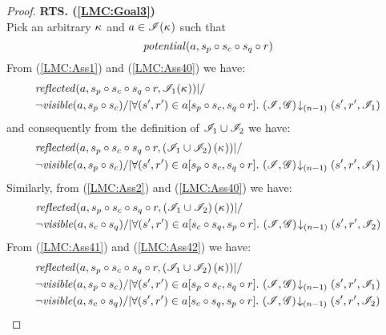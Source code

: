 \begin{lemma}
\begin{proof}
\noindent\textbf{RTS. (\ref{LMC:Goal3})}\\
Pick an arbitrary $\kappa_{}$ and $a \in\mathscr{I}(\kappa_{})$ such that
\begin{equation}
	\mathit{potential}(a, s_p \circ s_c \circ s_q \circ r) \label{LMC:Ass40}
\end{equation}
From (\ref{LMC:Ass1}) and (\ref{LMC:Ass40}) we have: 
%
\begin{align*}
	&\m{reflected}(a,s_p \composeL s_c \composeL s_q \composeL r,\lmod_{1}(\ca{})) |/\null \\
%  
  &\neg\m{visible}(a,s_p \composeL s_c) /| \for{(s', r') \in a[s_p \composeL s_c, s_q \composeL r]} \extendsAMUpto{\lmod, \gmod}{(n-1)}{s'}{r'}{\lmod_{1}}
\end{align*}
%
and consequently from the definition of $\mathscr{I}_1 \cup \mathscr{I}_2$ we have: 
%
\begin{align}
	&\m{reflected}(a,s_p \composeL s_c \composeL s_q \composeL r, \left( \lmod_{1} \cup \lmod_2 \right) (\ca{})) |/\null \nonumber \\
%  
  &\neg\m{visible}(a,s_p \composeL s_c) /| \for{(s', r') \in a[s_p \composeL s_c, s_q \composeL r]} \extendsAMUpto{\lmod, \gmod}{(n-1)}{s'}{r'}{\lmod_{1}} \label{LMC:Ass41}
\end{align}
Similarly, from (\ref{LMC:Ass2}) and (\ref{LMC:Ass40}) we have: 
%
\begin{align}
	&\m{reflected}(a,s_p \composeL s_c \composeL s_q \composeL r, \left(\lmod_1 \cup \lmod_{2}\right)(\ca{})) |/\null \nonumber \\
%  
  &\neg\m{visible}(a, s_c \composeL s_q) /| \for{(s', r') \in a[s_c \composeL s_q, s_p \composeL r]} \extendsAMUpto{\lmod, \gmod}{(n-1)}{s'}{r'}{\lmod_{2}} \label{LMC:Ass42}
\end{align}
From (\ref{LMC:Ass41}) and (\ref{LMC:Ass42}) we have: 
%
\begin{align}
	&\m{reflected}(a,s_p \composeL s_c \composeL s_q \composeL r, \left(\lmod_1 \cup \lmod_{2}\right)(\ca{})) |/\null \nonumber \\
%  
  &\neg\m{visible}(a,s_p \composeL s_c) /| \for{(s', r') \in a[s_p \composeL s_c, s_q \composeL r]} \extendsAMUpto{\lmod, \gmod}{(n-1)}{s'}{r'}{\lmod_{1}} \nonumber\\
  &\neg\m{visible}(a, s_c \composeL s_q) /| \for{(s', r') \in a[s_c \composeL s_q, s_p \composeL r]} \extendsAMUpto{\lmod, \gmod}{(n-1)}{s'}{r'}{\lmod_{2}} \label{LMC:Ass43}
\end{align}

\end{proof}
\end{lemma}
